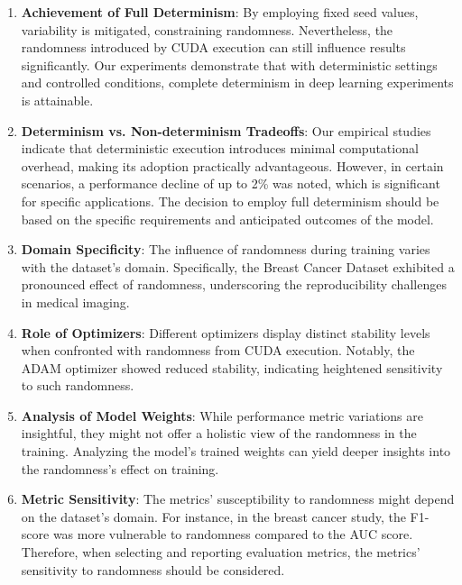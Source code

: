\begin{enumerate}
    \item \textbf{Achievement of Full Determinism}: By employing fixed seed values, variability is mitigated, constraining randomness. Nevertheless, the randomness introduced by CUDA execution can still influence results significantly. Our experiments demonstrate that with deterministic settings and controlled conditions, complete determinism in deep learning experiments is attainable.
    
    \item \textbf{Determinism vs. Non-determinism Tradeoffs}: Our empirical studies indicate that deterministic execution introduces minimal computational overhead, making its adoption practically advantageous. However, in certain scenarios, a performance decline of up to 2\% was noted, which is significant for specific applications. The decision to employ full determinism should be based on the specific requirements and anticipated outcomes of the model.
    
    \item \textbf{Domain Specificity}: The influence of randomness during training varies with the dataset's domain. Specifically, the Breast Cancer Dataset exhibited a pronounced effect of randomness, underscoring the reproducibility challenges in medical imaging.
    
    \item \textbf{Role of Optimizers}: Different optimizers display distinct stability levels when confronted with randomness from CUDA execution. Notably, the ADAM optimizer showed reduced stability, indicating heightened sensitivity to such randomness.
    
    \item \textbf{Analysis of Model Weights}: While performance metric variations are insightful, they might not offer a holistic view of the randomness in the training. Analyzing the model's trained weights can yield deeper insights into the randomness's effect on training.
    
    \item \textbf{Metric Sensitivity}: The metrics' susceptibility to randomness might depend on the dataset's domain. For instance, in the breast cancer study, the F1-score was more vulnerable to randomness compared to the AUC score. Therefore, when selecting and reporting evaluation metrics, the metrics' sensitivity to randomness should be considered.
\end{enumerate}
